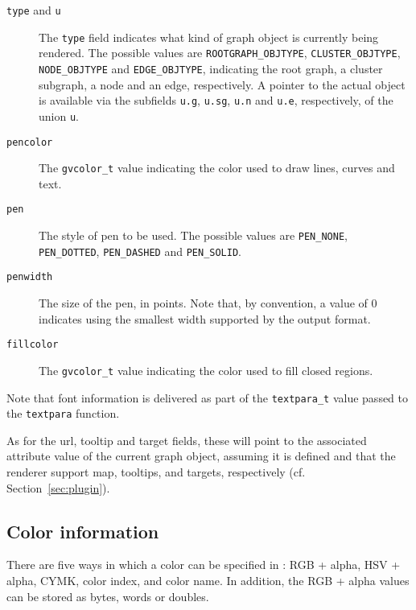 \begin{description}
\item[{\tt type} and {\tt u}]
The {\tt type} field indicates what kind of graph object is currently
being rendered. The possible values are 
{\tt ROOTGRAPH\_OBJTYPE}, {\tt CLUSTER\_OBJTYPE},
{\tt NODE\_OBJTYPE} and {\tt EDGE\_OBJTYPE},
indicating the root graph, a cluster subgraph, a node and an edge,
respectively.
A pointer to the actual object is available via the subfields
{\tt u.g}, {\tt u.sg}, {\tt u.n} and {\tt u.e}, respectively, 
of the union {\tt u}.
\item[{\tt pencolor}]
The {\tt gvcolor\_t} value indicating the color used to draw lines,
curves and text.
\item[{\tt pen}]
The style of pen to be used. The possible values are
{\tt PEN\_NONE}, {\tt PEN\_DOTTED},
{\tt PEN\_DASHED} and {\tt PEN\_SOLID}.
\item[{\tt penwidth}]
The size of the pen, in points.
Note that, by convention, a value of 0 indicates using the smallest
width supported by the output format.
\item[{\tt fillcolor}]
The {\tt gvcolor\_t} value indicating the color used to fill
closed regions.
\end{description}
Note that font information is delivered as part of the 
{\tt textpara\_t} value passed to the {\tt textpara} function.

As for the url, tooltip and target fields, these will point to
the associated attribute value of the current graph object,
assuming it is defined and that the renderer support map, tooltips,
and targets, respectively (cf. Section~\ref{sec:plugin}).

\subsection{Color information}
\label{sec:color}

There are five ways in which a color can be specified in \gviz:
RGB + alpha, HSV + alpha, CYMK, color index, and color name.
In addition, the RGB + alpha values can be stored as bytes, words
or doubles.

